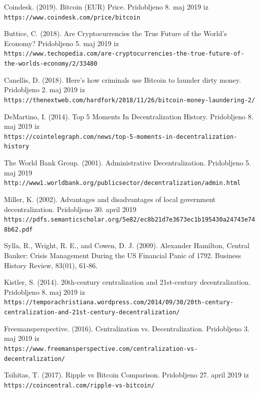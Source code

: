 \documentclass[letterpaper, titlepage, freqn]{article}
\begin{document}
\begin{thebibliography}{9}

\bibitem{} 
Coindesk. (2019). Bitcoin (EUR) Price. Pridobljeno 8. maj 2019 iz
\\\texttt{https://www.coindesk.com/price/bitcoin}

\bibitem{} 
Buttice, C. (2018). Are Cryptocurrencies the True Future of the World's Economy? Pridobljeno 5. maj 2019 iz
\\\texttt{https://www.techopedia.com/are-cryptocurrencies-the-true-future-of-the-worlds-economy/2/33480}

\bibitem{} 
Canellis, D. (2018). Here’s how criminals use Bitcoin to launder dirty money. Pridobljeno 2. maj 2019 iz
\\\texttt{https://thenextweb.com/hardfork/2018/11/26/bitcoin-money-laundering-2/}

\bibitem{} 
DeMartino, I. (2014). Top 5 Moments In Decentralization History. Pridobljeno 8. maj 2019 iz
\\\texttt{https://cointelegraph.com/news/top-5-moments-in-decentralization-history}

\bibitem{} 
The World Bank Group. (2001). Administrative Decentralization. Pridobljeno 5. maj 2019
\\\texttt{http://www1.worldbank.org/publicsector/decentralization/admin.html}

\bibitem{} 
Miller, K. (2002). Advantages and disadvantages of local government decentralization. Pridobljeno 30. april 2019
\\\texttt{https://pdfs.semanticscholar.org/5e82/ec8b21d7e3673ec1b195430a24743e748b62.pdf}

\bibitem
Sylla, R., Wright, R. E., and Cowen, D. J. (2009). Alexander Hamilton, Central Banker: Crisis Management During the US Financial Panic of 1792. Business History Review, 83(01), 61-86. 

\bibitem{} 
Kistler, S. (2014). 20th-century centralization and 21st-century decentralization. Pridobljeno 8. maj 2019 iz
\\\texttt{https://temporachristiana.wordpress.com/2014/09/30/20th-century-centralization-and-21st-century-decentralization/}

\bibitem{} 
Freemansperspective. (2016). Centralization vs. Decentralization. Pridobljeno 3. maj 2019 iz
\\\texttt{https://www.freemansperspective.com/centralization-vs-decentralization/}

\bibitem{} 
Tsihitas, T. (2017). Ripple vs Bitcoin Comparison. Pridobljeno 27. april 2019 iz
\\\texttt{https://coincentral.com/ripple-vs-bitcoin/}


\end{thebibliography}
\end{document}
